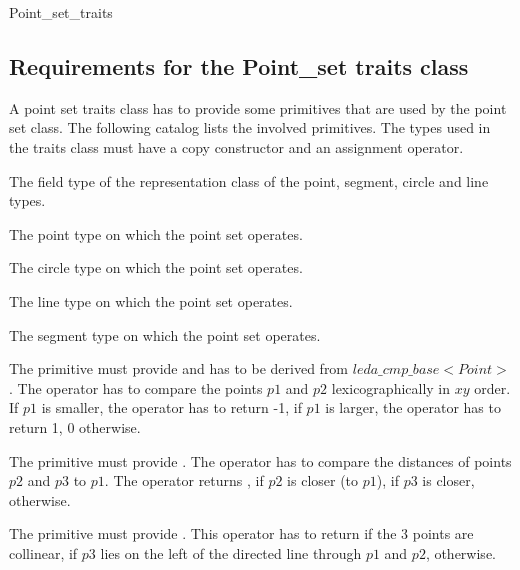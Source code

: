 \begin{ccRefConcept} {Point_set_traits}

\subsection{Requirements for the Point\_set traits class}

A point set traits class has to provide some primitives that are used by the point set class.
The following catalog lists the involved primitives.
The types used in the traits class must have a copy constructor and an assignment operator.

\ccTypes

%
       {The field type of the representation class of the point, segment, circle and line types.}

%
       {The point type on which the point set operates.}

%
       {The circle type on which the point set operates.}


\ccHtmlLinksOff
       
%
       {The line type on which the point set operates.}
       
\ccHtmlLinksOn

%
       {The segment type on which the point set operates.}
       
%
       {The primitive must provide 
	and has to be derived from $leda\_cmp\_base<Point>$.
	The operator has to compare the points $p1$ and $p2$ lexicographically in
	$xy$ order. If $p1$ is smaller, the operator has to return -1, if $p1$
        is larger, the operator has to return 1, 0 otherwise.
       }

%
       {The primitive must provide 
	.
	The operator has to compare the distances of points $p2$ and $p3$ to $p1$.
        The operator returns , if $p2$ is closer (to $p1$),  if $p3$ is closer,
         otherwise.
       }      

	{The primitive must provide 
	.
	This operator has to return  if the 3 points are collinear,
	 if $p3$ lies on the left of the directed line through $p1$ and $p2$,
	 otherwise.
	}
	

\end{ccRefConcept}
